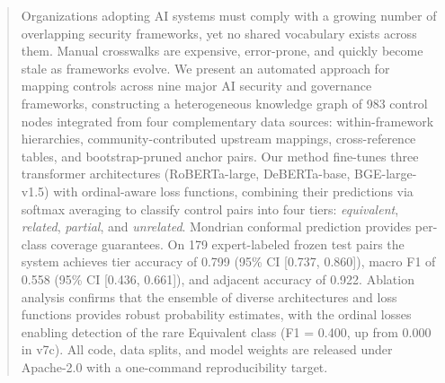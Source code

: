 \begin{abstract}
Organizations adopting AI systems must comply with a growing number of
overlapping security frameworks, yet no shared vocabulary exists across
them. Manual crosswalks are expensive, error-prone, and quickly become
stale as frameworks evolve. We present an automated approach for mapping
controls across nine major AI security and governance frameworks,
constructing a heterogeneous knowledge graph of 983 control nodes
integrated from four complementary data sources: within-framework
hierarchies, community-contributed upstream mappings, cross-reference
tables, and bootstrap-pruned anchor pairs. Our method fine-tunes three transformer architectures
(RoBERTa-large, DeBERTa-base, BGE-large-v1.5) with ordinal-aware loss
functions, combining their predictions via softmax averaging to classify
control pairs into four tiers: \emph{equivalent}, \emph{related},
\emph{partial}, and \emph{unrelated}. Mondrian conformal prediction
provides per-class coverage guarantees. On 179 expert-labeled
frozen test pairs the system achieves tier accuracy of 0.799 (95\% CI
[0.737, 0.860]), macro F1 of 0.558 (95\% CI [0.436, 0.661]), and
adjacent accuracy of 0.922. Ablation analysis confirms that the
ensemble of diverse architectures and loss functions provides robust
probability estimates, with the ordinal losses enabling detection of
the rare Equivalent class (F1 = 0.400, up from 0.000 in v7c). All code, data splits, and model weights are released under
Apache-2.0 with a one-command reproducibility target.
\end{abstract}
